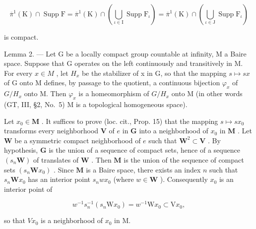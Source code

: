 \[
\overline {{\pi}} ^ {1} (\mathrm{K}) \cap \operatorname{Supp} \mathrm{F} = \overline {{\pi}} ^ {1} (\mathrm{K}) \cap \left(\bigcup_ {\iota \in \mathrm{I}} \operatorname{Supp} \mathrm{F} _ {\iota}\right) = \overline {{\pi}} ^ {1} (\mathrm{K}) \cap \left(\bigcup_ {\iota \in \mathrm{J}} \operatorname{Supp} \mathrm{F} _ {\iota}\right)
\]

is compact.

Lemma 2. --- Let G be a locally compact group countable at infinity, M a Baire space. Suppose that G operates on the left continuously and transitively in M. For every \(x \in M\) , let \(H_{x}\) be the stabilizer of x in G, so that the mapping \(s \mapsto sx\) of G onto M defines, by passage to the quotient, a continuous bijection \(\varphi_{x}\) of \(G/H_{x}\) onto M. Then \(\varphi_{x}\) is a homeomorphism of \(G/H_{x}\) onto M (in other words (GT, III, §2, No.~5) M is a topological homogeneous space).

Let \(x_0 \in \mathbf{M}\) . It suffices to prove (loc. cit., Prop. 15) that the mapping \(s \mapsto sx_0\) transforms every neighborhood \(\mathbf{V}\) of \(e\) in \(\mathbf{G}\) into a neighborhood of \(x_0\) in \(\mathbf{M}\) . Let \(\mathbf{W}\) be a symmetric compact neighborhood of \(e\) such that \(\mathbf{W}^2 \subset \mathbf{V}\) . By hypothesis, \(\mathbf{G}\) is the union of a sequence of compact sets, hence of a sequence \((s_n\mathbf{W})\) of translates of \(\mathbf{W}\) . Then \(\mathbf{M}\) is the union of the sequence of compact sets \((s_n\mathbf{W}x_0)\) . Since \(\mathbf{M}\) is a Baire space, there exists an index \(n\) such that \(s_n\mathbf{W}x_0\) has an interior point \(s_nwx_0\) (where \(w \in \mathbf{W}\) ). Consequently \(x_0\) is an interior point of

\[
w ^ {- 1} s _ {n} ^ {- 1} (s _ {n} \mathrm{W} x _ {0}) = w ^ {- 1} \mathrm{W} x _ {0} \subset \mathrm{V} x _ {0},
\]

so that \(Vx_{0}\) is a neighborhood of \(x_{0}\) in M.

